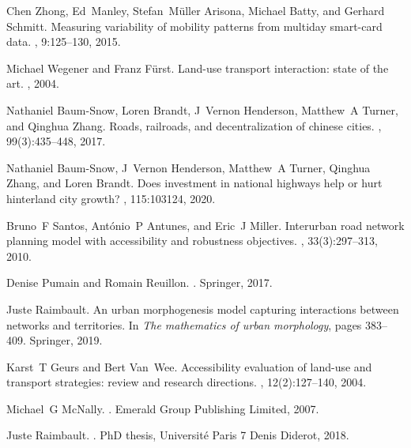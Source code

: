 \documentclass[10pt]{article}
\begin{document}
\begin{thebibliography}{10}

Chen Zhong, Ed~Manley, Stefan~M{\"u}ller Arisona, Michael Batty, and Gerhard
  Schmitt.
\newblock Measuring variability of mobility patterns from multiday smart-card
  data.
, 9:125--130, 2015.

Michael Wegener and Franz F{\"u}rst.
\newblock Land-use transport interaction: state of the art.
, 2004.

Nathaniel Baum-Snow, Loren Brandt, J~Vernon Henderson, Matthew~A Turner, and
  Qinghua Zhang.
\newblock Roads, railroads, and decentralization of chinese cities.
, 99(3):435--448, 2017.

Nathaniel Baum-Snow, J~Vernon Henderson, Matthew~A Turner, Qinghua Zhang, and
  Loren Brandt.
\newblock Does investment in national highways help or hurt hinterland city
  growth?
, 115:103124, 2020.

Bruno~F Santos, Ant{\'o}nio~P Antunes, and Eric~J Miller.
\newblock Interurban road network planning model with accessibility and
  robustness objectives.
, 33(3):297--313, 2010.

Denise Pumain and Romain Reuillon.
.
\newblock Springer, 2017.

Juste Raimbault.
\newblock An urban morphogenesis model capturing interactions between networks
  and territories.
\newblock In {\em The mathematics of urban morphology}, pages 383--409.
  Springer, 2019.

Karst~T Geurs and Bert Van~Wee.
\newblock Accessibility evaluation of land-use and transport strategies: review
  and research directions.
, 12(2):127--140, 2004.

Michael~G McNally.
.
\newblock Emerald Group Publishing Limited, 2007.

Juste Raimbault.
.
\newblock PhD thesis, Universit{\'e} Paris 7 Denis Diderot, 2018.


\end{thebibliography}
\end{document}
